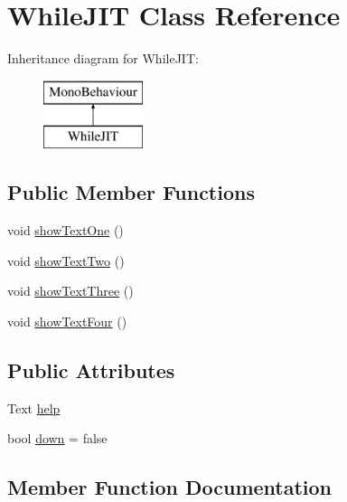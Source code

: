 \hypertarget{class_while_j_i_t}{}\section{While\+J\+IT Class Reference}
\label{class_while_j_i_t}
Inheritance diagram for While\+J\+IT\+:\begin{figure}[H]
\begin{center}
\leavevmode
\includegraphics[height=2.000000cm]{class_while_j_i_t}
\end{center}
\end{figure}
\subsection*{Public Member Functions}
\begin{DoxyCompactItemize}
\item 
void \hyperlink{class_while_j_i_t_a6902e3a53f7850f52fe873113c2a92be}{show\+Text\+One} ()
\item 
void \hyperlink{class_while_j_i_t_a9dd3868aecdede76652b7aad7aec9679}{show\+Text\+Two} ()
\item 
void \hyperlink{class_while_j_i_t_a0ede379fbb165cc203924718f52ce6b6}{show\+Text\+Three} ()
\item 
void \hyperlink{class_while_j_i_t_a263a701abb4834a9c4ede8ee0b6a30e5}{show\+Text\+Four} ()
\end{DoxyCompactItemize}
\subsection*{Public Attributes}
\begin{DoxyCompactItemize}
\item 
Text \hyperlink{class_while_j_i_t_a655e87cf228ee7e4f45610a782bf5a1c}{help}
\item 
bool \hyperlink{class_while_j_i_t_a0c18911e6e115ab64186a82b55e01a66}{down} = false
\end{DoxyCompactItemize}


\subsection{Member Function Documentation}
\mbox{\label{class_while_j_i_t_a263a701abb4834a9c4ede8ee0b6a30e5}} 
